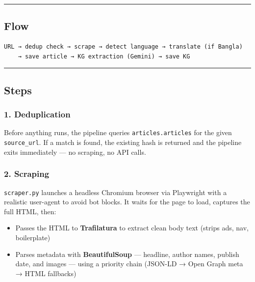 \documentclass[
]{article}
\providecommand{\tightlist}{%
  \setlength{\itemsep}{0pt}\setlength{\parskip}{0pt}}
\begin{document}
\begin{center}\rule{0.5\linewidth}{0.5pt}\end{center}

\subsection{Flow}\label{flow}

\begin{verbatim}
URL → dedup check → scrape → detect language → translate (if Bangla)
    → save article → KG extraction (Gemini) → save KG
\end{verbatim}

\begin{center}\rule{0.5\linewidth}{0.5pt}\end{center}

\subsection{Steps}\label{steps}

\subsubsection{1. Deduplication}\label{1-deduplication}

Before anything runs, the pipeline queries \texttt{articles.articles}
for the given \texttt{source\_url}. If a match is found, the existing
hash is returned and the pipeline exits immediately --- no scraping, no
API calls.

\subsubsection{2. Scraping}\label{2-scraping}

\texttt{scraper.py} launches a headless Chromium browser via Playwright
with a realistic user-agent to avoid bot blocks. It waits for the page
to load, captures the full HTML, then:

\begin{itemize}
\tightlist
\item
  Passes the HTML to \textbf{Trafilatura} to extract clean body text
  (strips ads, nav, boilerplate)
\item
  Parses metadata with \textbf{BeautifulSoup} --- headline, author
  names, publish date, and images --- using a priority chain (JSON-LD →
  Open Graph meta → HTML fallbacks)
\end{itemize}
\end{document}

